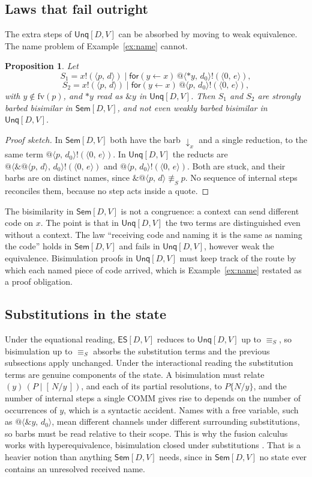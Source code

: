 \documentclass[11pt,a4paper]{article}
\makeatletter
\theoremstyle{plain}
\newtheorem{proposition}[theorem]{Proposition}
\theoremstyle{definition}
\theoremstyle{remark}
\newcommand{\pr}[2]{\langle #1,\,#2\rangle}
\newcommand{\qn}[2]{@\langle #1,\,#2\rangle}
\newcommand{\out}[2]{#1!(#2)}
\newcommand{\rcv}[3]{\mathsf{for}(#1 \leftarrow #2)\,#3}
\newcommand{\drop}[1]{{*}#1}
\newcommand{\unq}[1]{\mathop{\&}#1}
\newcommand{\esub}[2]{[\,#1/#2\,]}
\newcommand{\scope}[2]{(#1)\,#2}
\newcommand{\scong}{\equiv_{S}}
\newcommand{\ssub}[2]{\{#1/#2\}}
\newcommand{\Sem}{\textsf{Sem}[D,V]}
\newcommand{\Unq}{\textsf{Unq}[D,V]}
\newcommand{\ES}{\textsf{ES}[D,V]}
\newcommand{\fv}{\mathrm{fv}}
\newcommand{\barb}[1]{\mathop{\downarrow}_{#1}}
\makeatother
\begin{document}
\subsection{Laws that fail outright}

The extra steps of $\Unq$ can be absorbed by moving to weak equivalence. The
name problem of Example~\ref{ex:name} cannot.

\begin{proposition}\label{prop:namefail}
Let
\[
  S_1 = \out{x}{\pr{p}{d}}\mid\rcv{y}{x}{\out{\qn{\drop{y}}{d_0}}{\pr{0}{e}}},
  \]
  \[
  S_2 = \out{x}{\pr{p}{d}}\mid\rcv{y}{x}{\out{\qn{p}{d_0}}{\pr{0}{e}}},
\]
with $y\notin\fv(p)$, and $\drop{y}$ read as $\unq{y}$ in $\Unq$. Then $S_1$
and $S_2$ are strongly barbed bisimilar in $\Sem$, and not even weakly barbed
bisimilar in $\Unq$.
\end{proposition}

\begin{proof}[Proof sketch]
In $\Sem$ both have the barb $\barb{x}$ and a single reduction, to the same
term $\out{\qn{p}{d_0}}{\pr{0}{e}}$. In $\Unq$ the reducts are
$\out{\qn{\unq{\qn{p}{d}}}{d_0}}{\pr{0}{e}}$ and
$\out{\qn{p}{d_0}}{\pr{0}{e}}$. Both are stuck, and their barbs are on
distinct names, since $\unq{\qn{p}{d}}\not\scong p$. No sequence of internal
steps reconciles them, because no step acts inside a quote.
\end{proof}

The bisimilarity in $\Sem$ is not a congruence: a context can send different
code on $x$. The point is that in $\Unq$ the two terms are distinguished even
without a context. The law ``receiving code and naming it is the same as
naming the code'' holds in $\Sem$ and fails in $\Unq$, however weak the
equivalence. Bisimulation proofs in $\Unq$ must keep track of the route by
which each named piece of code arrived, which is Example~\ref{ex:name}
restated as a proof obligation.

\subsection{Substitutions in the state}

Under the equational reading, $\ES$ reduces to $\Unq$ up to $\scong$, so
bisimulation up to $\scong$ absorbs the substitution terms and the previous
subsections apply unchanged. Under the interactional reading the substitution
terms are genuine components of the state. A bisimulation must relate
$\scope{y}{(P\mid\esub{N}{y})}$, and each of its partial resolutions, to
$P\ssub{N}{y}$, and the number of internal steps a single COMM gives rise to
depends on the number of occurrences of $y$, which is a syntactic accident.
Names with a free variable, such as $\qn{\unq{y}}{d_0}$, mean different
channels under different surrounding substitutions, so barbs must be read
relative to their scope. This is why the fusion calculus works with
hyperequivalence, bisimulation closed under substitutions \cite{PV98}. That is
a heavier notion than anything $\Sem$ needs, since in $\Sem$ no state ever
contains an unresolved received name.
\end{document}
